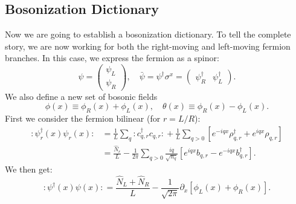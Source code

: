 \subsection{Bosonization Dictionary}
Now we are going to establish a bosonization dictionary.
To tell the complete story, we are now working for both the right-moving and left-moving fermion branches.
In this case, we express the fermion as a spinor:
\begin{equation}
	\psi = \left(\begin{array}{c}
		\psi_L \\ \psi_R
	\end{array} \right),\quad
	\bar\psi = \psi^\dagger\sigma^x =  \left(\begin{array}{cc}
		\psi^\dagger_R & \psi_L^\dagger
	\end{array} \right).
\end{equation}
We also define a new set of bosonic fields
\begin{equation}
	\phi(x) \equiv \phi_R(x) + \phi_L(x), \quad
	\theta(x) \equiv \phi_R(x) - \phi_L(x).
\end{equation}
First we consider the fermion bilinear (for $r=L/R$):
\begin{equation}
\begin{aligned}
	{:\mathrel{\psi_r^\dagger(x)\psi_r(x)}:}
	&= \frac{1}{L}\sum_{q} {:\mathrel{c_{q,r}^\dagger c_{q,r}}:} + \frac{1}{L}\sum_{q>0}[e^{-iqx}\rho^\dagger_{q,r}+e^{iqx}\rho_{q,r}] \\
	&= \frac{\hat N_r}{L} - \frac{1}{2\pi} \sum_{q>0} \frac{iq}{\sqrt{n_q}} \left[e^{iqx}b_{q,r} - e^{-iqx}b^\dagger_{q,r}\right].
\end{aligned}
\end{equation}
We then get:
\begin{equation}
	{:\mathrel{\psi^\dagger(x)\psi(x)}:}
	= \frac{\hat N_L +\hat N_R}{L} - \frac{1}{\sqrt{2\pi}} \partial_x \left[\phi_L(x)+\phi_R(x)\right].
\end{equation}



